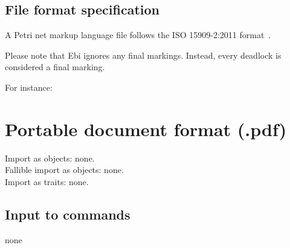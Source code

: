 {\subsection*{File format specification}A Petri net markup language file follows the ISO 15909-2:2011 format~\cite{pnml}. 

    Please note that Ebi ignores any final markings.
    Instead, every deadlock is considered a final marking.

    For instance:
    
\clearpage
\section{Portable document format (.pdf)}
\label{filehandler:portable document format}
Import as objects: none.
\\Fallible import as objects: none.
\\Import as traits: none.
\subsection*{Input to commands} none
}
